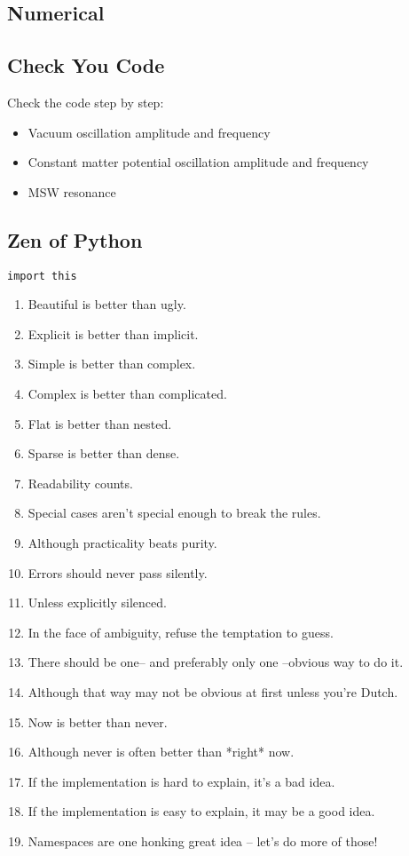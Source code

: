 \documentclass{sciposter}
\begin{document}
\begin{multicols}{3}




\section{Numerical}

\subsection{Check You Code}
Check the code step by step:

\begin{itemize}
\item Vacuum oscillation amplitude and frequency
\item Constant matter potential oscillation amplitude and frequency
\item MSW resonance
\end{itemize}


\subsection{Zen of Python}

\verb+import this+

\begin{enumerate}
\item     Beautiful is better than ugly.
\item     Explicit is better than implicit.
\item     Simple is better than complex.
\item     Complex is better than complicated.
\item     Flat is better than nested.
\item     Sparse is better than dense.
\item     Readability counts.
\item     Special cases aren't special enough to break the rules.
\item     Although practicality beats purity.
\item     Errors should never pass silently.
\item     Unless explicitly silenced.
\item     In the face of ambiguity, refuse the temptation to guess.
\item     There should be one-- and preferably only one --obvious way to do it.
\item     Although that way may not be obvious at first unless you're Dutch.
\item     Now is better than never.
\item     Although never is often better than *right* now.
\item     If the implementation is hard to explain, it's a bad idea.
\item     If the implementation is easy to explain, it may be a good idea.
\item     Namespaces are one honking great idea -- let's do more of those!
\end{enumerate}



\end{multicols}
\end{document}
